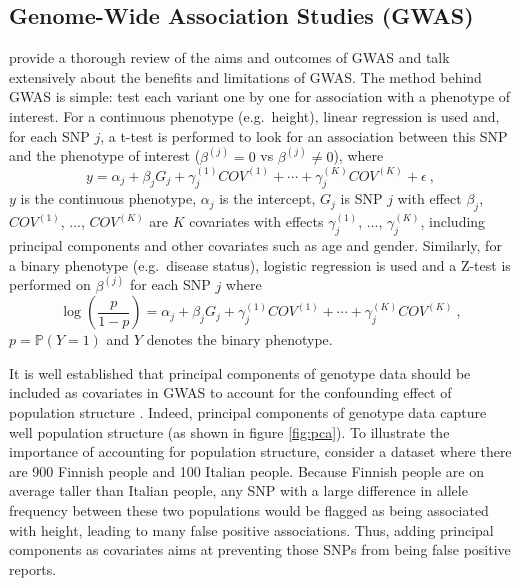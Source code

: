 \subsection{Genome-Wide Association Studies (GWAS)}

\cite{visscher201710} provide a thorough review of the aims and outcomes of GWAS and \cite{tam2019benefits} talk extensively about the benefits and limitations of GWAS.
The method behind GWAS is simple: test each variant one by one for association with a phenotype of interest.
For a continuous phenotype (e.g.\ height), linear regression is used and, for each SNP $j$, a t-test is performed to look for an association between this SNP and the phenotype of interest ($\beta^{(j)} = 0$ vs $\beta^{(j)} \neq 0$), where
\begin{equation}
y = \alpha_j + \beta_j G_{j} + \gamma_j^{(1)} COV^{(1)} + \cdots + \gamma_j^{(K)} COV^{(K)} + \epsilon~,\label{eq:gwas1}
\end{equation}
$y$ is the continuous phenotype, $\alpha_j$ is the intercept, $G_{j}$ is SNP $j$ with effect $\beta_j$, $COV^{(1)}$, ..., $COV^{(K)}$ are $K$ covariates with effects $\gamma_j^{(1)}$, ..., $\gamma_j^{(K)}$, including principal components and other covariates such as age and gender. Similarly, for a binary phenotype (e.g.\ disease status), logistic regression is used and a Z-test is performed on $\beta^{(j)}$ for each SNP $j$ where
\begin{equation}
\log{\left(\frac{p}{1-p}\right)} = \alpha_j + \beta_j G_{j} + \gamma_j^{(1)} COV^{(1)} + \cdots + \gamma_j^{(K)} COV^{(K)}~,\label{eq:gwas2}
\end{equation}
$p = \mathbb{P}(Y = 1)$ and $Y$ denotes the binary phenotype.

It is well established that principal components of genotype data should be included as covariates in GWAS to account for the confounding effect of population structure \cite[]{price2006principal}. Indeed, principal components of genotype data capture well population structure (as shown in figure \ref{fig:pca}). 
To illustrate the importance of accounting for population structure, consider a dataset where there are 900 Finnish people and 100 Italian people. Because Finnish people are on average taller than Italian people, any SNP with a large difference in allele frequency between these two populations would be flagged as being associated with height, leading to many false positive associations. Thus, adding principal components as covariates aims at preventing those SNPs from being false positive reports.

